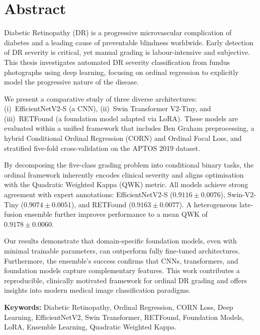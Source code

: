 \chapter*{Abstract}

Diabetic Retinopathy (DR) is a progressive microvascular complication of diabetes and a leading cause of preventable blindness worldwide. Early detection of DR severity is critical, yet manual grading is labour-intensive and subjective. This thesis investigates automated DR severity classification from fundus photographs using deep learning, focusing on ordinal regression to explicitly model the progressive nature of the disease.

We present a comparative study of three diverse architectures: (i)~EfficientNetV2-S (a CNN), (ii)~Swin Transformer V2-Tiny, and (iii)~RETFound (a foundation model adapted via LoRA). These models are evaluated within a unified framework that includes Ben Graham preprocessing, a hybrid Conditional Ordinal Regression (CORN) and Ordinal Focal Loss, and stratified five-fold cross-validation on the APTOS 2019 dataset.

By decomposing the five-class grading problem into conditional binary tasks, the ordinal framework inherently encodes clinical severity and aligns optimisation with the Quadratic Weighted Kappa (QWK) metric. All models achieve strong agreement with expert annotations: EfficientNetV2-S ($0.9116 \pm 0.0076$), Swin-V2-Tiny ($0.9074 \pm 0.0051$), and RETFound ($0.9163 \pm 0.0077$). A heterogeneous late-fusion ensemble further improves performance to a mean QWK of $\mathbf{0.9178 \pm 0.0060}$.

Our results demonstrate that domain-specific foundation models, even with minimal trainable parameters, can outperform fully fine-tuned architectures. Furthermore, the ensemble's success confirms that CNNs, transformers, and foundation models capture complementary features. This work contributes a reproducible, clinically motivated framework for ordinal DR grading and offers insights into modern medical image classification paradigms.

\vspace{0.5cm}
\noindent\textbf{Keywords:} Diabetic Retinopathy, Ordinal Regression, CORN Loss, Deep Learning, EfficientNetV2, Swin Transformer, RETFound, Foundation Models, LoRA, Ensemble Learning, Quadratic Weighted Kappa.
